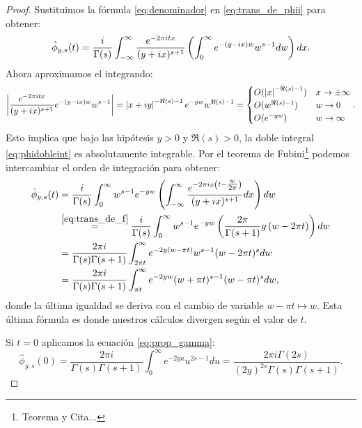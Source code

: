 \documentclass[../../tesis_maestria]{subfiles}
\begin{document}
\begin{proof}
Sustituimos la f\'ormula \eqref{eq:denominador} en \eqref{eq:trans_de_phii} para obtener:
\begin{equation}\label{eq:phidobleint}
  \hat{\phi}_{y,s}(t)=
  \frac{i}{\Gamma(s)}\int_{-\infty}^{\infty}\frac{e^{-2\pi itx}}{(y+ix)^{s+1}}
  \left( \int_0^{\infty}e^{-(y-ix)w}w^{s-1}dw \right)dx.
\end{equation}
Ahora aproximamos el integrando:
\[
  \left| \frac{e^{-2\pi itx}}{(y+ix)^{s+1}}e^{-(y-ix)w}w^{s-1} \right|
  =\left| x+iy \right|^{-\Re(s)-1}e^{-yw}w^{\Re(s)-1}=
  \begin{cases}
    O(\left| x \right|^{-\Re(s)-1}) & x\rightarrow\pm\infty\\
    O(w^{\Re(s)-1}) & w\rightarrow 0\\
    O(e^{-yw}) & w\rightarrow\infty
  \end{cases}.
\]
Esto implica que bajo las hip\'otesis $y>0$ y $\Re(s)>0$, la doble integral \eqref{eq:phidobleint}
es absolutamente integrable. Por el teorema de Fubini\footnote{Teorema y Cita...}
podemos intercambiar el orden de integraci\'on para obtener:
\begin{align}
  \hat{\phi}_{y,s}(t)&=
  \frac{i}{\Gamma(s)}\int_{0}^{\infty}w^{s-1}e^{-yw}
  \left( \int_{-\infty}^{\infty}
  \frac{e^{-2\pi ix\left( t-\tfrac{w}{2\pi} \right)}}{(y+ix)^{s+1}}dx \right)dw\nonumber\\
  &\overset{\eqref{eq:trans_de_f}}{=}\frac{i}{\Gamma(s)}\int_{0}^{\infty}w^{s-1}e^{-yw}
    \left( \frac{2\pi}{\Gamma(s+1)}g\left( w-2\pi t \right) \right)dw\nonumber\\
  &=\frac{2\pi i}{\Gamma(s)\Gamma(s+1)}
    \int_{2\pi t}^{\infty}e^{-2y(w-\pi t)}w^{s-1}(w-2\pi t)^sdw\nonumber\\
   &=\frac{2\pi i}{\Gamma(s)\Gamma(s+1)}\int_{\pi t}^{\infty}e^{-2yw}(w+\pi t)^{s-1}(w-\pi t)^sdw,
   \label{eq:phisemifinal}
\end{align}
donde la \'ultima igualdad se deriva con el cambio de variable $w-\pi t\mapsto w$. Esta \'ultima
f\'ormula es donde nuestros c\'alculos divergen seg\'un el valor de $t$.

Si $t=0$ aplicamos la ecuaci\'on \eqref{eq:prop_gamma}:
\[
  \hat{\phi}_{y,s}(0)=\frac{2\pi i}{\Gamma(s)\Gamma(s+1)}\int_0^{\infty}e^{-2yu}u^{2s-1}du=
  \frac{2\pi i\Gamma(2s)}{(2y)^{2s}\Gamma(s)\Gamma(s+1)}.
\]


\end{proof}
\end{document}
